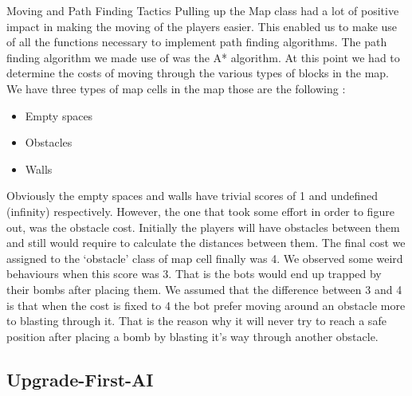 Moving and Path Finding Tactics
Pulling up the Map class had a lot of positive impact in making the moving of the players easier. This enabled us to make use of all the functions necessary to implement path finding algorithms. The path finding algorithm we made use of was the A* algorithm. At this point we had to determine the costs of moving through the various types of blocks in the map. We have three types of map cells in the map those are the following :
\begin{itemize}
\item Empty spaces
\item Obstacles
\item Walls
\end{itemize}

Obviously the empty spaces and walls have trivial scores of 1 and undefined (infinity) respectively. However, the one that took some effort in order to figure out, was the obstacle cost.
Initially the players will have obstacles between them and still would require to calculate the distances between them. The final cost we assigned to the ‘obstacle’ class of map cell finally was 4. We observed some weird behaviours when this score was 3. That is the bots would end up trapped by their bombs after placing them. We assumed that the difference between 3 and 4 is that when the cost is fixed to 4 the bot prefer moving around an obstacle more to blasting through it. That is the reason why it will never try to reach a safe position after placing a bomb by blasting it’s way through another obstacle.

\subsection{Upgrade-First-AI}
